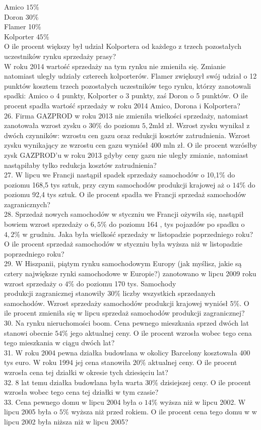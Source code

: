 \documentclass[10pt]{article}
\begin{document}
Amico \(15 \%\)\\
Doron 30\%\\
Flamer 10\%\\
Kolporter \(45 \%\)\\
O ile procent większy był udział Kolportera od każdego z trzech pozostałych uczestników rynku sprzedaży prasy?\\
W roku 2014 wartość sprzedaży na tym rynku nie zmieniła się. Zmianie natomiast uległy udziały czterech kolporterów. Flamer zwiększył swój udział o 12 punktów kosztem trzech pozostałych uczestników tego rynku, którzy zanotowali spadki: Amico o 4 punkty, Kolporter o 3 punkty, zaś Doron o 5 punktów. O ile procent spadła wartość sprzedaży w roku 2014 Amico, Dorona i Kolportera?\\
26. Firma GAZPROD w roku 2013 nie zmieniła wielkości sprzedaży, natomiast zanotowała wzrost zysku o \(30 \%\) do poziomu \(5,2 \mathrm{mld}\) zł. Wzrost zysku wynikał z dwóch czynników: wzrostu cen gazu oraz redukcji kosztów zatrudnienia. Wzrost zysku wynikający ze wzrostu cen gazu wyniósł 400 mln zł. O ile procent wzrósłby zysk GAZPROD'u w roku 2013 gdyby ceny gazu nie uległy zmianie, natomiast nastąpiłaby tylko redukcja kosztów zatrudnienia?\\
27. W lipcu we Francji nastąpił spadek sprzedaży samochodów o 10,1\% do poziomu 168,5 tys sztuk, przy czym samochodów produkcji krajowej aż o \(14 \%\) do poziomu 92,4 tys sztuk. O ile procent spadła we Francji sprzedaż samochodów zagranicznych?\\
28. Sprzedaż nowych samochodów w styczniu we Francji ożywiła się, nastąpił bowiem wzrost sprzedaży o \(6,5 \%\) do poziomu 164 , tys pojazdów po spadku o \(4,2 \%\) w grudniu. Jaka była wielkość sprzedaży w listopadzie poprzedniego roku? O ile procent sprzedaż samochodów w styczniu była wyższa niż w listopadzie poprzedniego roku?\\
29. W Hiszpanii, piątym rynku samochodowym Europy (jak myślisz, jakie są cztery największe rynki samochodowe w Europie?) zanotowano w lipcu 2009 roku wzrost sprzedaży o \(4 \%\) do poziomu 170 tys. Samochody\\
produkcji zagranicznej stanowiły \(30 \%\) liczby wszystkich sprzedanych samochodów. Wzrost sprzedaży samochodów produkcji krajowej wyniósł \(5 \%\). O ile procent zmieniła się w lipcu sprzedaż samochodów produkcji zagranicznej?\\
30. Na rynku nieruchomości boom. Cena pewnego mieszkania sprzed dwóch lat stanowi obecnie \(54 \%\) jego aktualnej ceny. O ile procent wzrosła wobec tego cena tego mieszkania w ciągu dwóch lat?\\
31. W roku 2004 pewna działka budowlana w okolicy Barcelony kosztowała 400 tys euro. W roku 1994 jej cena stanowiła \(20 \%\) aktualnej ceny. O ile procent wzrosła cena tej działki w okresie tych dziesięciu lat?\\
32. 8 lat temu działka budowlana była warta \(30 \%\) dzisiejszej ceny. O ile procent wzrosła wobec tego cena tej działki w tym czasie?\\
33. Cena pewnego domu w lipcu 2004 była o \(14 \%\) wyższa niż w lipcu 2002. W lipcu 2005 była o \(5 \%\) wyższa niż przed rokiem. O ile procent cena tego domu w w lipcu 2002 była niższa niż w lipcu 2005?
\end{document}
